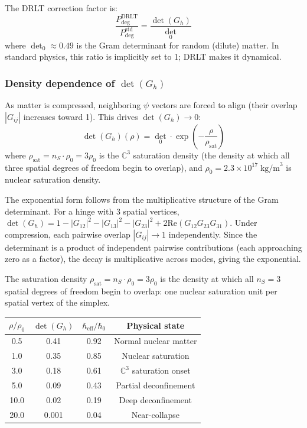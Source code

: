 \documentclass[12pt]{article}
\theoremstyle{remark}
\theoremstyle{definition}
\newcommand{\CC}{\mathbb{C}}
\begin{document}
The DRLT correction factor is:
\begin{equation}
\frac{P_\text{deg}^\text{DRLT}}{P_\text{deg}^\text{std}} = \frac{\det(G_h)}{\det_0}
\end{equation}
where $\det_0 \approx 0.49$ is the Gram determinant for random (dilute) matter. In standard physics, this ratio is implicitly set to 1; DRLT makes it dynamical.

\subsubsection{Density dependence of $\det(G_h)$}

As matter is compressed, neighboring $\psi$ vectors are forced to align (their overlap $|G_{ij}|$ increases toward 1). This drives $\det(G_h) \to 0$:
\begin{equation}
\det(G_h)(\rho) = \det_0 \cdot \exp\!\left(-\frac{\rho}{\rho_\text{sat}}\right)
\label{eq:det_rho}
\end{equation}
where $\rho_\text{sat} = n_S \cdot \rho_0 = 3\rho_0$ is the $\CC^3$ saturation density (the density at which all three spatial degrees of freedom begin to overlap), and $\rho_0 = 2.3 \times 10^{17}\;\text{kg/m}^3$ is nuclear saturation density.

The exponential form follows from the multiplicative structure of the Gram determinant. For a hinge with 3 spatial vertices, $\det(G_h) = 1 - |G_{12}|^2 - |G_{13}|^2 - |G_{23}|^2 + 2\text{Re}(G_{12}G_{23}G_{31})$. Under compression, each pairwise overlap $|G_{ij}| \to 1$ independently. Since the determinant is a product of independent pairwise contributions (each approaching zero as a factor), the decay is multiplicative across modes, giving the exponential.

The saturation density $\rho_\text{sat} = n_S \cdot \rho_0 = 3\rho_0$ is the density at which all $n_S = 3$ spatial degrees of freedom begin to overlap: one nuclear saturation unit per spatial vertex of the simplex.

\begin{center}
\begin{tabular}{cccc}
\hline
$\rho/\rho_0$ & $\det(G_h)$ & $\hbar_\text{eff}/\hbar_0$ & Physical state \\
\hline
0.5 & 0.41 & 0.92 & Normal nuclear matter \\
1.0 & 0.35 & 0.85 & Nuclear saturation \\
3.0 & 0.18 & 0.61 & $\CC^3$ saturation onset \\
5.0 & 0.09 & 0.43 & Partial deconfinement \\
10.0 & 0.02 & 0.19 & Deep deconfinement \\
20.0 & 0.001 & 0.04 & Near-collapse \\
\hline
\end{tabular}
\end{center}
\end{document}
